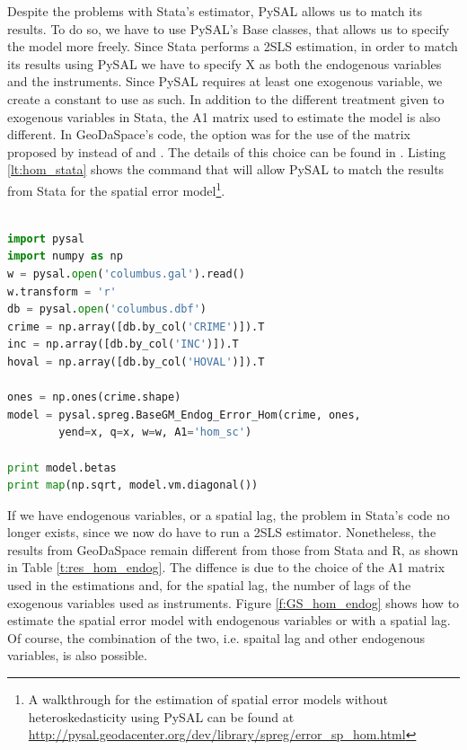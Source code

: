 \documentclass{article}
\begin{document}
Despite the problems with Stata's estimator, PySAL allows us to match its results. To do so, we have to use PySAL's Base classes, that allows us to specify the model more freely. Since Stata performs a 2SLS estimation, in order to match its results using PySAL we have to specify X as both the endogenous variables and the instruments. Since PySAL requires at least one exogenous variable, we create a constant to use as such. In addition to the different treatment given to exogenous variables in Stata, the A1 matrix used to estimate the model is also different. In GeoDaSpace's code, the option was for the use of the matrix proposed by \citet{Arraiz10} instead of \citet{Drukker10} and \citet{Drukker11}. The details of this choice can be found in \citet{Anselin11}. Listing \ref{lt:hom_stata} shows the command that will allow PySAL to match the results from Stata for the spatial error model\footnote{A walkthrough for the estimation of spatial error models without heteroskedasticity using PySAL can be found at \url{http://pysal.geodacenter.org/dev/library/spreg/error_sp_hom.html}}. 

\begin{code}
\begin{lstlisting}[label=lt:hom_stata,caption=Using PySAL to match the results of spatial error models from Stata,language=Python]

import pysal
import numpy as np
w = pysal.open('columbus.gal').read()
w.transform = 'r'
db = pysal.open('columbus.dbf')
crime = np.array([db.by_col('CRIME')]).T
inc = np.array([db.by_col('INC')]).T
hoval = np.array([db.by_col('HOVAL')]).T

ones = np.ones(crime.shape)
model = pysal.spreg.BaseGM_Endog_Error_Hom(crime, ones,
        yend=x, q=x, w=w, A1='hom_sc')

print model.betas
print map(np.sqrt, model.vm.diagonal())

\end{lstlisting}
\end{code}

If we have endogenous variables, or a spatial lag, the problem in Stata's code no longer exists, since we now do have to run a 2SLS estimator. Nonetheless, the results from GeoDaSpace remain different from those from Stata and R, as shown in Table \ref{t:res_hom_endog}. The diffence is due to the choice of the A1 matrix used in the estimations and, for the spatial lag, the number of lags of the exogenous variables used as instruments. Figure \ref{f:GS_hom_endog} shows how to estimate the spatial error model with endogenous variables or with a spatial lag. Of course, the combination of the two, i.e. spaital lag and other endogenous variables, is also possible.
\end{document}
